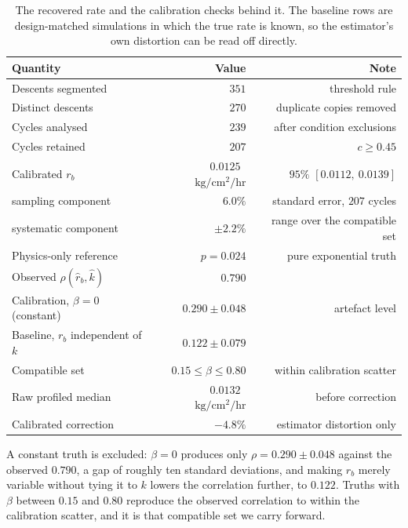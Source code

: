 \documentclass[sigconf]{acmart}
\newcommand{\ratu}{\ensuremath{\mathrm{kg/cm^{2}/hr}}}
\newcommand{\rb}{\ensuremath{r_{b}}}
\newcommand{\rbh}{\ensuremath{\hat{r}_{b}}}
\newcommand{\kh}{\ensuremath{\hat{k}}}
\begin{document}
\begin{table}[t]
\caption{The recovered rate and the calibration checks behind it. The
baseline rows are design-matched simulations in which the true rate is
known, so the estimator's own distortion can be read off directly.}
\label{tab:rate}
\centering
\begin{tabular}{lrr}
\toprule
Quantity & Value & Note \\
\midrule
Descents segmented & $351$ & threshold rule \\
Distinct descents & $270$ & duplicate copies removed \\
Cycles analysed & $239$ & after condition exclusions \\
Cycles retained & $207$ & $c \ge 0.45$ \\
Calibrated \rb{} & $0.0125$~\ratu{} & $95\%$ $[0.0112,\ 0.0139]$ \\
\quad sampling component & $6.0\%$ & standard error, $207$ cycles \\
\quad systematic component & $\pm 2.2\%$ & range over the compatible set \\
Physics-only reference & $p=0.024$ & pure exponential truth \\
\midrule
Observed $\rho(\rbh,\kh)$ & $0.790$ & \\
Calibration, $\beta=0$ (constant) & $0.290 \pm 0.048$ & artefact level \\
Baseline, \rb{} independent of $k$ & $0.122 \pm 0.079$ & \\
Compatible set & $0.15 \le \beta \le 0.80$ & within calibration scatter \\
\midrule
Raw profiled median & $0.0132$~\ratu{} & before correction \\
Calibrated correction & $-4.8\%$ & estimator distortion only \\
\bottomrule
\end{tabular}
\end{table}

A constant truth is excluded: $\beta=0$ produces only
$\rho=0.290 \pm 0.048$ against the observed $0.790$, a gap of roughly
ten standard deviations, and making \rb{} merely variable without
tying it to $k$ lowers the correlation further, to $0.122$. Truths
with $\beta$ between $0.15$ and $0.80$ reproduce the observed
correlation to within the calibration scatter, and it is that
compatible set we carry forward.
\end{document}
